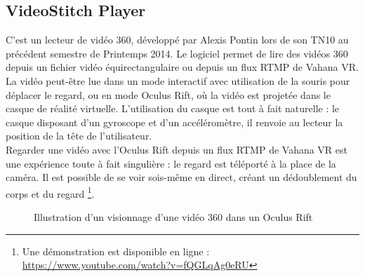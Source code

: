 \subsection{VideoStitch Player}
\label{videostitch-player-section}
C'est un lecteur de vidéo 360, développé par Alexis Pontin lors de son TN10 au précédent
semestre de Printemps 2014. Le logiciel permet de lire des vidéos 360 depuis un 
fichier vidéo équirectangulaire ou depuis un flux RTMP de Vahana VR. La vidéo peut-être
lue dans un mode interactif avec utilisation de la souris pour déplacer le regard,
ou en mode Oculus Rift, où la vidéo est projetée dans le casque de réalité virtuelle.
L'utilisation du casque est tout à fait naturelle : le casque disposant d'un gyroscope
et d'un accéléromètre, il renvoie au lecteur la position de la tête de l'utilisateur.\\
Regarder une vidéo avec l'Oculus Rift depuis un flux RTMP de Vahana VR est une 
expérience toute à fait singulière : le regard est téléporté à la place de la caméra.
Il est possible de se voir sois-même en direct, créant un dédoublement du corps et du regard
\footnote{Une démonstration est disponible en ligne : \url{https://www.youtube.com/watch?v=fQGLqAg0eRU}}.
\begin{figure}
  \centering
  \caption{Illustration d'un visionnage d'une vidéo 360 dans un Oculus Rift}
\end{figure}

